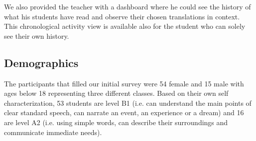 We also provided the teacher with a dashboard where he could see the history of what his students have read and observe their chosen translations in context. This chronological activity view is available also for the student who can solely see their own history.







\subsection{Demographics}


The participants that filled our initial survey were 54 female and 15 male with ages below 18 representing three different classes. Based on their own self characterization, 53 students are level B1 (i.e. can understand the main points of clear standard speech, can narrate an event, an experience or a dream) and 16 are level A2 (i.e. using simple words, can describe their surroundings and communicate immediate needs). 














